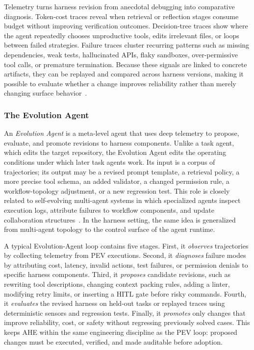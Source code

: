 \documentclass{llmxive}
\begin{document}
Telemetry turns harness revision from anecdotal debugging into comparative diagnosis. Token-cost traces reveal when retrieval or reflection stages consume budget without improving verification outcomes. Decision-tree traces show where the agent repeatedly chooses unproductive tools, edits irrelevant files, or loops between failed strategies. Failure traces cluster recurring patterns such as missing dependencies, weak tests, hallucinated APIs, flaky sandboxes, over-permissive tool calls, or premature termination. Because these signals are linked to concrete artifacts, they can be replayed and compared across harness versions, making it possible to evaluate whether a change improves reliability rather than merely changing surface behavior~\cite{jimenez2024swebench, feng2026longcli}.

\subsubsection{The Evolution Agent}
An \emph{Evolution Agent} is a meta-level agent that uses deep telemetry to propose, evaluate, and promote revisions to harness components. Unlike a task agent, which edits the target repository, the Evolution Agent edits the operating conditions under which later task agents work. Its input is a corpus of trajectories; its output may be a revised prompt template, a retrieval policy, a more precise tool schema, an added validator, a changed permission rule, a workflow-topology adjustment, or a new regression test. This role is closely related to self-evolving multi-agent systems in which specialized agents inspect execution logs, attribute failures to workflow components, and update collaboration structures~\cite{Hu2025EvoMAC,zou2025latentmas}. In the harness setting, the same idea is generalized from multi-agent topology to the control surface of the agent runtime.

A typical Evolution-Agent loop contains five stages. First, it \emph{observes} trajectories by collecting telemetry from PEV executions. Second, it \emph{diagnoses} failure modes by attributing cost, latency, invalid actions, test failures, or permission denials to specific harness components. Third, it \emph{proposes} candidate revisions, such as rewriting tool descriptions, changing context packing rules, adding a linter, modifying retry limits, or inserting a HITL gate before risky commands. Fourth, it \emph{evaluates} the revised harness on held-out tasks or replayed traces using deterministic sensors and regression tests. Finally, it \emph{promotes} only changes that improve reliability, cost, or safety without regressing previously solved cases. This keeps AHE within the same engineering discipline as the PEV loop: proposed changes must be executed, verified, and made auditable before adoption.
\end{document}
